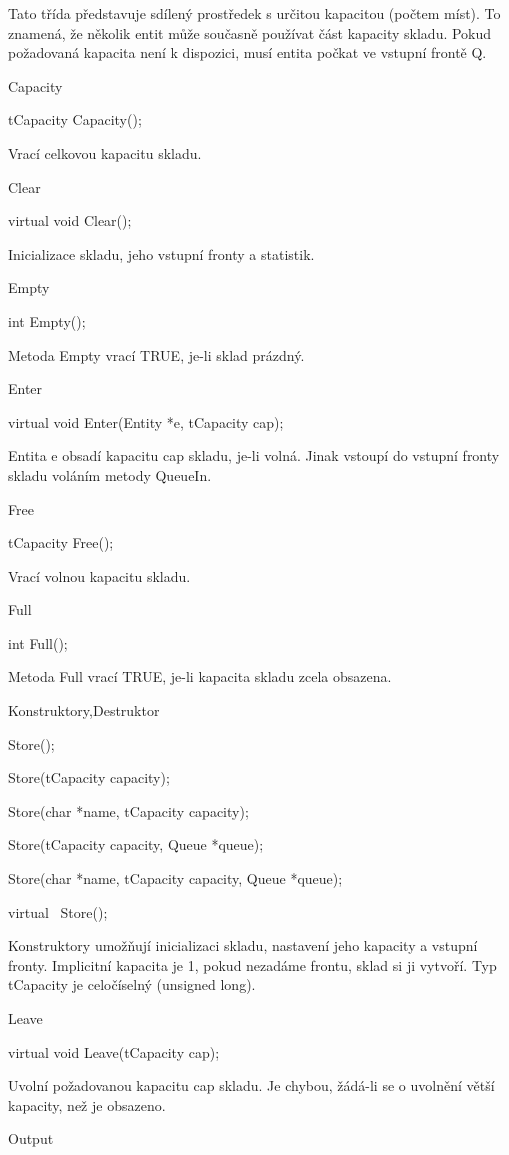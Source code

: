 \documentclass[a4paper]{article}
\begin{document}
Tato třída představuje sdílený prostředek s určitou kapacitou (počtem
míst). To znamená, že několik entit může současně používat část kapacity
skladu. Pokud požadovaná kapacita není k dispozici, musí entita počkat
ve vstupní frontě Q.


Capacity

  tCapacity Capacity();


Vrací celkovou kapacitu skladu.


Clear

  virtual void Clear();


Inicializace skladu, jeho vstupní fronty a statistik.


Empty

  int Empty();


Metoda Empty vrací TRUE, je-li sklad prázdný.


Enter

  virtual void Enter(Entity *e, tCapacity cap);


Entita e obsadí kapacitu cap skladu, je-li volná.
Jinak vstoupí do vstupní fronty skladu voláním metody QueueIn.


Free

  tCapacity Free();


Vrací volnou kapacitu skladu.


Full

  int Full();


Metoda Full vrací TRUE, je-li kapacita skladu zcela obsazena.


Konstruktory,Destruktor

  Store();

  Store(tCapacity capacity);

  Store(char *name, tCapacity capacity);

  Store(tCapacity capacity, Queue *queue);

  Store(char *name, tCapacity capacity, Queue *queue);

  virtual ~Store();


Konstruktory umožňují inicializaci skladu, nastavení jeho kapacity
a vstupní fronty. Implicitní kapacita je 1, pokud nezadáme frontu,
sklad si ji vytvoří. Typ tCapacity je celočíselný (unsigned
long).


Leave

  virtual void Leave(tCapacity cap);


Uvolní požadovanou kapacitu cap skladu. Je chybou, žádá-li
se o uvolnění větší kapacity, než je obsazeno.


Output
\end{document}
